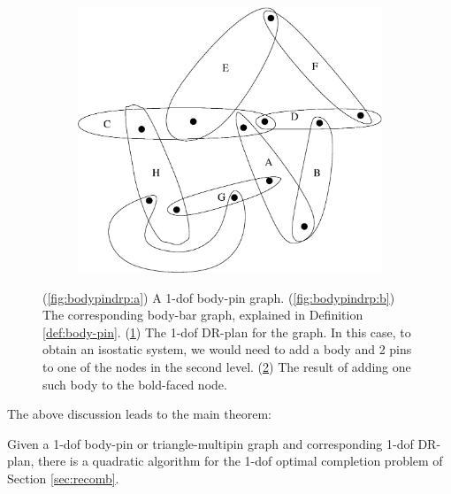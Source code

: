 \begin{figure}
\begin{subfigure}{0.35\linewidth}
        \caption{}\label{fig:bodypindrp:c}
    \end{subfigure}
    \hfill
    \begin{subfigure}{0.2\linewidth}\centering
        \includegraphics[height=\myMinHeight]{../../img/bodypin2}
        \caption{}\label{fig:bodypindrp:d}
    \end{subfigure}
    \caption{(\ref{fig:bodypindrp:a}) A 1-dof body-pin graph. (\ref{fig:bodypindrp:b}) The corresponding body-bar graph, explained in Definition \ref{def:body-pin}. (\ref{fig:bodypindrp:c}) The 1-dof DR-plan for the graph. In this case, to obtain an isostatic system, we would need to add a body and 2 pins to one of the nodes in the second level. (\ref{fig:bodypindrp:d}) The result of adding one such body to the bold-faced node.}
    \label{fig:bodypindrp}
\end{figure}

The above discussion leads to the main theorem:
\begin{theorem*}
\label{thm:1dofcase}
    Given a 1-dof body-pin or triangle-multipin graph and corresponding 1-dof DR-plan, there is a quadratic algorithm for the 1-dof optimal completion problem of Section \ref{sec:recomb}.
\end{theorem*}



